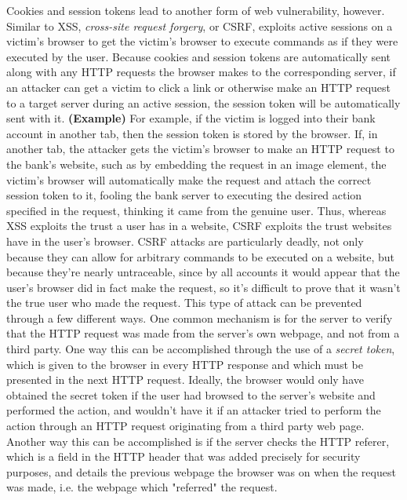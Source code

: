 \documentclass{article}
\begin{document}
\newline
Cookies and session tokens lead to another form of web vulnerability, however. Similar to XSS, \textit{cross-site request forgery}, or CSRF, exploits active sessions on a victim's browser to get the victim's browser to execute commands as if they were executed by the user. Because cookies and session tokens are automatically sent along with any HTTP requests the browser makes to the corresponding server, if an attacker can get a victim to click a link or otherwise make an HTTP request to a target server during an active session, the session token will be automatically sent with it.
\newline \newline
\textbf{(Example)} For example, if the victim is logged into their bank account in another tab, then the session token is stored by the browser. If, in another tab, the attacker gets the victim's browser to make an HTTP request to the bank's website, such as by embedding the request in an image element, the victim's browser will automatically make the request and attach the correct session token to it, fooling the bank server to executing the desired action specified in the request, thinking it came from the genuine user.
\newline \newline
Thus, whereas XSS exploits the trust a user has in a website, CSRF exploits the trust websites have in the user's browser. CSRF attacks are particularly deadly, not only because they can allow for arbitrary commands to be executed on a website, but because they're nearly untraceable, since by all accounts it would appear that the user's browser did in fact make the request, so it's difficult to prove that it wasn't the true user who made the request. This type of attack can be prevented through a few different ways. One common mechanism is for the server to verify that the HTTP request was made from the server's own webpage, and not from a third party.\newline
One way this can be accomplished through the use of a \textit{secret token}, which is given to the browser in every HTTP response and which must be presented in the next HTTP request. Ideally, the browser would only have obtained the secret token if the user had browsed to the server's website and performed the action, and wouldn't have it if an attacker tried to perform the action through an HTTP request originating from a third party web page.
\newline
Another way this can be accomplished is if the server checks the HTTP referer, which is a field in the HTTP header that was added precisely for security purposes, and details the previous webpage the browser was on when the request was made, i.e. the webpage which "referred" the request.
\end{document}

